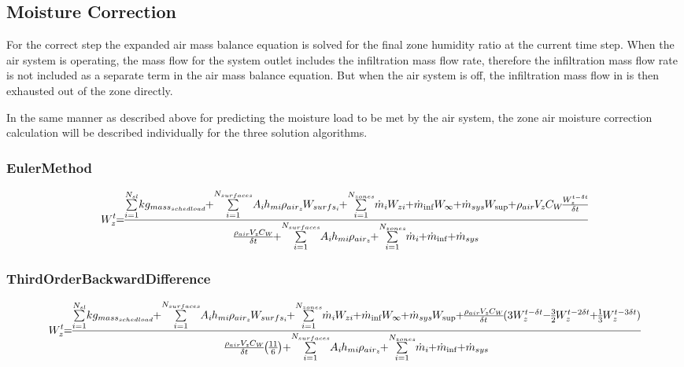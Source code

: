 \subsection{Moisture Correction}\label{moisture-correction}

For the correct step the expanded air mass balance equation is solved for the final zone humidity ratio at the current time step. When the air system is operating, the mass flow for the system outlet includes the infiltration mass flow rate, therefore the infiltration mass flow rate is not included as a separate term in the air mass balance equation. But when the air system is off, the infiltration mass flow in is then exhausted out of the zone directly.

In the same manner as described above for predicting the moisture load to be met by the air system, the zone air moisture correction calculation will be described individually for the three solution algorithms.

\subsubsection{EulerMethod}\label{eulermethod-1-001}

\begin{equation}
\medmuskip=0mu
\thinmuskip=0mu
\thickmuskip=0mu
\nulldelimiterspace=0pt
\scriptspace=0pt
W_z^t = \frac{{\sum\limits_{i = 1}^{{N_{sl}}} {k{g_{mas{s_{sched\;load}}}}}  + \sum\limits_{i = 1}^{{N_{surfaces}}} {{A_i}{h_{mi}}} {\rho_{ai{r_z}}}{W_{surf{s_i}}} + \sum\limits_{i = 1}^{{N_{zones}}} {{{\dot m}_i}} {W_{zi}} + {{\dot m}_{\inf }}{W_\infty } + {{\dot m}_{sys}}{W_{\sup }} + {\rho_{air}}{V_z}{C_W}\frac{{W_z^{t - \delta t}}}{{\delta t}}}}{{\frac{{{\rho_{air}}{V_z}{C_W}}}{{\delta t}} + \sum\limits_{i = 1}^{{N_{surfaces}}} {{A_i}{h_{mi}}{\rho_{ai{r_z}}}}  + \sum\limits_{i = 1}^{{N_{zones}}} {{{\dot m}_i}}  + {{\dot m}_{\inf }} + {{\dot m}_{sys}}}}
\end{equation}

\subsubsection{ThirdOrderBackwardDifference}\label{thirdorderbackwarddifference-1-001}

{\scriptsize
\begin{equation}
\medmuskip=0mu
\thinmuskip=0mu
\thickmuskip=0mu
\nulldelimiterspace=0pt
\scriptspace=0pt
W_z^t = \frac{{\sum\limits_{i = 1}^{{N_{sl}}} {k{g_{mas{s_{sched\;load}}}}}  + \sum\limits_{i = 1}^{{N_{surfaces}}} {{A_i}{h_{mi}}} {\rho_{ai{r_z}}}{W_{surf{s_i}}} + \sum\limits_{i = 1}^{{N_{zones}}} {{{\dot m}_i}} {W_{zi}} + {{\dot m}_{\inf }}{W_\infty } + {{\dot m}_{sys}}{W_{\sup }} + \frac{{{\rho_{air}}{V_z}{C_W}}}{{\delta t}}(3W_z^{t - \delta t} - \frac{3}{2}W_z^{t - 2\delta t} + \frac{1}{3}W_z^{t - 3\delta t})}}{{\frac{{{\rho_{air}}{V_z}{C_W}}}{{\delta t}}\left( {\frac{{11}}{6}} \right) + \sum\limits_{i = 1}^{{N_{surfaces}}} {{A_i}{h_{mi}}{\rho_{ai{r_z}}}}  + \sum\limits_{i = 1}^{{N_{zones}}} {{{\dot m}_i}}  + {{\dot m}_{\inf }} + {{\dot m}_{sys}}}}
\end{equation}}

